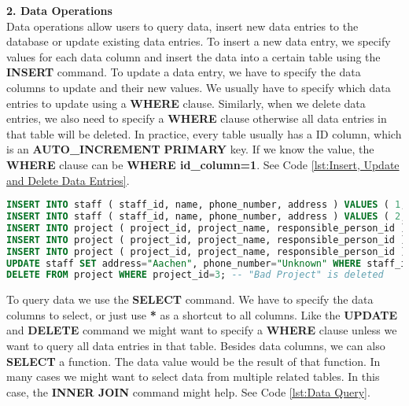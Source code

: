 \textbf{2. Data Operations\\}
Data operations allow users to query data, insert new data entries to the database or update existing data entries. To insert a new data entry, we specify values for each data column and insert the data into a certain table using the \textbf{INSERT} command. To update a data entry, we have to specify the data columns to update and their new values. We usually have to specify which data entries to update using a \textbf{WHERE} clause. Similarly, when we delete data entries, we also need to specify a \textbf{WHERE} clause otherwise all data entries in that table will be deleted. In practice, every table usually has a ID column, which is an \textbf{AUTO\_INCREMENT} \textbf{PRIMARY} key. If we know the value, the \textbf{WHERE} clause can be \textbf{WHERE id\_column=1}. See Code \ref{lst:Insert, Update and Delete Data Entries}.

\begin{lstlisting}[language=SQL, caption={Insert, Update and Delete Data Entries\label{lst:Insert, Update and Delete Data Entries}}]
INSERT INTO staff ( staff_id, name, phone_number, address ) VALUES ( 1, "Lei", "NaN", "Sichuan" );
INSERT INTO staff ( staff_id, name, phone_number, address ) VALUES ( 2, "Bastl", "NaN", "Munich" );
INSERT INTO project ( project_id, project_name, responsible_person_id ) VALUES ( 1, "IASRegisterManager", 1 ); -- responsible person is Lei
INSERT INTO project ( project_id, project_name, responsible_person_id ) VALUES ( 2, "Best Project", 2 ); -- responsible person is Bastl
INSERT INTO project ( project_id, project_name, responsible_person_id ) VALUES ( 3, "Bad Project", 1 );   
UPDATE staff SET address="Aachen", phone_number="Unknown" WHERE staff_id=1; -- Lei's address and phone_number change
DELETE FROM project WHERE project_id=3; -- "Bad Project" is deleted
\end{lstlisting}

To query data we use the \textbf{SELECT} command. We have to specify the data columns to select, or just use \textbf{*} as a shortcut to all columns. Like the \textbf{UPDATE} and \textbf{DELETE} command we might want to specify a \textbf{WHERE} clause unless we want to query all data entries in that table. Besides data columns, we can also \textbf{SELECT} a function. The data value would be the result of that function. In many cases we might want to select data from multiple related tables. In this case, the \textbf{INNER JOIN} command might help. See Code \ref{lst:Data Query}.

